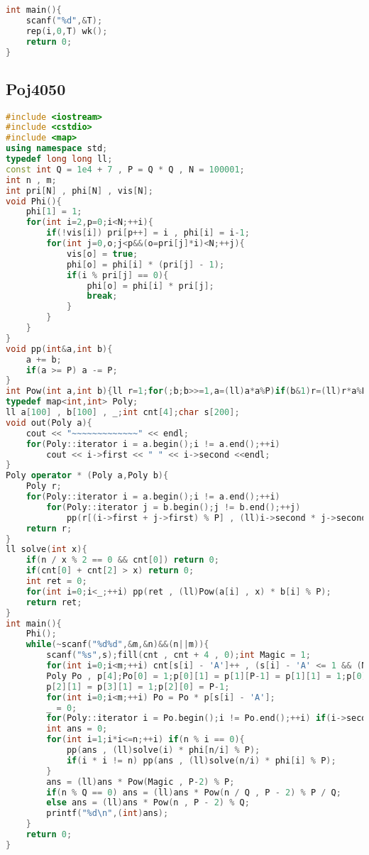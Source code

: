 \begin{lstlisting}[language=C++]
int main(){
    scanf("%d",&T);
    rep(i,0,T) wk();
    return 0;
}
\end{lstlisting}
\subsection{Poj4050}
\begin{lstlisting}[language=C++]
#include <iostream>
#include <cstdio>
#include <map>
using namespace std;
typedef long long ll;
const int Q = 1e4 + 7 , P = Q * Q , N = 100001;
int n , m;
int pri[N] , phi[N] , vis[N];
void Phi(){
    phi[1] = 1;
    for(int i=2,p=0;i<N;++i){
        if(!vis[i]) pri[p++] = i , phi[i] = i-1;
        for(int j=0,o;j<p&&(o=pri[j]*i)<N;++j){
            vis[o] = true;
            phi[o] = phi[i] * (pri[j] - 1);
            if(i % pri[j] == 0){
                phi[o] = phi[i] * pri[j];
                break;
            }
        }
    }
}
void pp(int&a,int b){
    a += b;
    if(a >= P) a -= P;
}
int Pow(int a,int b){ll r=1;for(;b;b>>=1,a=(ll)a*a%P)if(b&1)r=(ll)r*a%P;return r;}
typedef map<int,int> Poly;
ll a[100] , b[100] , _;int cnt[4];char s[200];
void out(Poly a){
    cout << "~~~~~~~~~~~~~" << endl;
    for(Poly::iterator i = a.begin();i != a.end();++i)
        cout << i->first << " " << i->second <<endl;
}
Poly operator * (Poly a,Poly b){
    Poly r;
    for(Poly::iterator i = a.begin();i != a.end();++i)
        for(Poly::iterator j = b.begin();j != b.end();++j)
            pp(r[(i->first + j->first) % P] , (ll)i->second * j->second % P);
    return r;
}
ll solve(int x){
    if(n / x % 2 == 0 && cnt[0]) return 0;
    if(cnt[0] + cnt[2] > x) return 0;
    int ret = 0;
    for(int i=0;i<_;++i) pp(ret , (ll)Pow(a[i] , x) * b[i] % P);
    return ret;
}
int main(){
    Phi();
    while(~scanf("%d%d",&m,&n)&&(n||m)){
        scanf("%s",s);fill(cnt , cnt + 4 , 0);int Magic = 1;
        for(int i=0;i<m;++i) cnt[s[i] - 'A']++ , (s[i] - 'A' <= 1 && (Magic<<=1));
        Poly Po , p[4];Po[0] = 1;p[0][1] = p[1][P-1] = p[1][1] = 1;p[0][P-1] = P-1;
        p[2][1] = p[3][1] = 1;p[2][0] = P-1;
        for(int i=0;i<m;++i) Po = Po * p[s[i] - 'A'];
        _ = 0;
        for(Poly::iterator i = Po.begin();i != Po.end();++i) if(i->second) a[_] = i->first , b[_++] = i->second;
        int ans = 0;
        for(int i=1;i*i<=n;++i) if(n % i == 0){
            pp(ans , (ll)solve(i) * phi[n/i] % P);
            if(i * i != n) pp(ans , (ll)solve(n/i) * phi[i] % P);
        }
        ans = (ll)ans * Pow(Magic , P-2) % P;
        if(n % Q == 0) ans = (ll)ans * Pow(n / Q , P - 2) % P / Q;
        else ans = (ll)ans * Pow(n , P - 2) % Q;
        printf("%d\n",(int)ans);
    }
    return 0;
}
\end{lstlisting}
